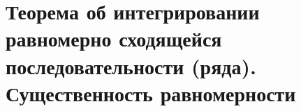 \section{Теорема об интегрировании равномерно сходящейся последовательности (ряда). Существенность равномерности}

